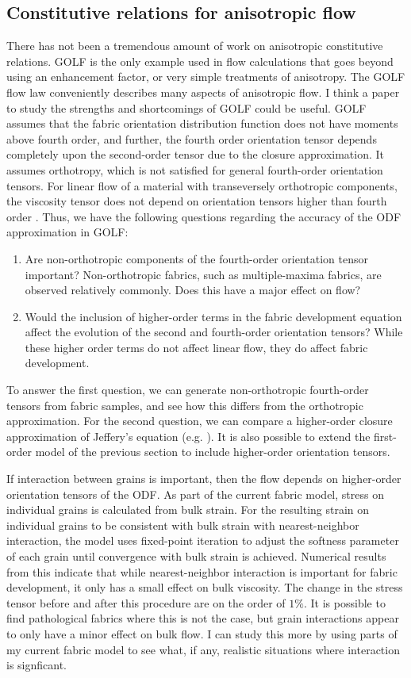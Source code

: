 \documentclass{article}
\begin{document}
\subsection{Constitutive relations for anisotropic flow}
There has not been a tremendous amount of work on anisotropic constitutive relations. GOLF is the only example used in flow calculations that goes beyond using an enhancement factor, or very simple treatments of anisotropy. The GOLF flow law conveniently describes many aspects of anisotropic flow. I think a paper to study the strengths and shortcomings of GOLF could be useful. GOLF assumes that the fabric orientation distribution function does not have moments above fourth order, and further, the fourth order orientation tensor depends completely upon the second-order tensor due to the closure approximation. It assumes orthotropy, which is not satisfied for general fourth-order orientation tensors. For linear flow of a material with transeversely orthotropic components, the viscosity tensor does not depend on orientation tensors higher than fourth order \citep{advani1987}. Thus, we have the following questions regarding the accuracy of the ODF approximation in GOLF: 
\begin{enumerate}
   \item Are non-orthotropic components of the fourth-order orientation tensor important? Non-orthotropic fabrics, such as multiple-maxima fabrics, are observed relatively commonly. Does this have a major effect on flow?
   \item Would the inclusion of higher-order terms in the fabric development equation affect the evolution of the second and fourth-order orientation tensors? While these higher order terms do not affect linear flow, they do affect fabric development.
\end{enumerate}
To answer the first question, we can generate non-orthotropic fourth-order tensors from fabric samples, and see how this differs from the orthotropic approximation. For the second question, we can compare a higher-order closure approximation of Jeffery's equation (e.g. \citet{montgomery2010}). It is also possible to extend the first-order model of the previous section to include higher-order orientation tensors.

If interaction between grains is important, then the flow depends on higher-order orientation tensors of the ODF. As part of the current fabric model, stress on individual grains is calculated from bulk strain. For the resulting strain on individual grains to be consistent with bulk strain with nearest-neighbor interaction, the model uses fixed-point iteration to adjust the softness parameter of each grain until convergence with bulk strain is achieved. Numerical results from this indicate that while nearest-neighbor interaction is important for fabric development, it only has a small effect on bulk viscosity. The change in the stress tensor before and after this procedure are on the order of $1\%$. It is possible to find pathological fabrics where this is not the case, but grain interactions appear to only have a minor effect on bulk flow. I can study this more by using parts of my current fabric model to see what, if any, realistic situations where interaction is signficant.
\end{document}
